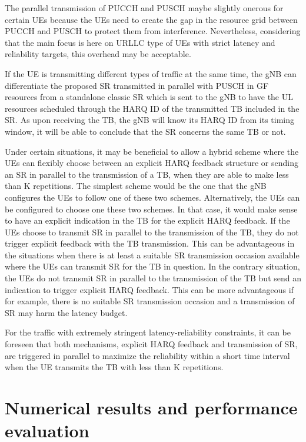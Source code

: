 \documentclass[conference]{IEEEtran}
\begin{document}
The parallel transmission of PUCCH and PUSCH maybe slightly onerous for certain UEs because the UEs need to create the gap in the resource grid between PUCCH and PUSCH to protect them from interference. Nevertheless, considering that the main focus is here on URLLC type of UEs with strict latency and reliability targets, this overhead may be acceptable.

If the UE is transmitting different types of traffic at the same time, the gNB can differentiate the proposed SR transmitted in parallel with PUSCH in GF resources from a standalone classic SR which is sent to the gNB to have the UL resources scheduled through the HARQ ID of the transmitted TB included in the SR. As upon receiving the TB, the gNB will know its HARQ ID from its timing window, it will be able to conclude that the SR concerns the same TB or not.

Under certain situations, it may be beneficial to allow a hybrid scheme where the UEs can flexibly choose between an explicit HARQ feedback structure or sending an SR in parallel to the transmission of a TB, when they are able to make less than K repetitions. The simplest scheme would be the one that the gNB configures the UEs to follow one of these two schemes. Alternatively, the UEs can be configured to choose one these two schemes. In that case, it would make sense to have an explicit indication in the TB for the explicit HARQ feedback. If the UEs choose to transmit SR in parallel to the transmission of the TB, they do not trigger explicit feedback with the TB transmission. This can be advantageous in the situations when there is at least a suitable SR transmission occasion available where the UEs can transmit SR for the TB in question. In the contrary situation, the UEs do not transmit SR in parallel to the transmission of the TB but send an indication to trigger explicit HARQ feedback. This can be more advantageous if for example, there is no suitable SR transmission occasion and a transmission of SR may harm the latency budget.

For the traffic with extremely stringent latency-reliability constraints, it can be foreseen that both mechanisms, explicit HARQ feedback and transmission of SR, are triggered in parallel to maximize the reliability within a short time interval when the UE transmits the TB with less than K repetitions.

\section{Numerical results and performance evaluation}\label{IV}
\end{document}
